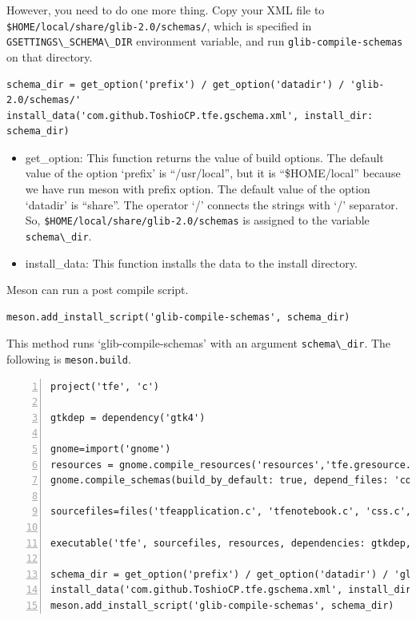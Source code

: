 However, you need to do one more thing. Copy your XML file to
\passthrough{\lstinline!$HOME/local/share/glib-2.0/schemas/!}, which is
specified in \passthrough{\lstinline!GSETTINGS\_SCHEMA\_DIR!}
environment variable, and run
\passthrough{\lstinline!glib-compile-schemas!} on that directory.

\begin{lstlisting}
schema_dir = get_option('prefix') / get_option('datadir') / 'glib-2.0/schemas/'
install_data('com.github.ToshioCP.tfe.gschema.xml', install_dir: schema_dir)
\end{lstlisting}

\begin{itemize}
\tightlist
\item
  get\_option: This function returns the value of build options. The
  default value of the option `prefix' is ``/usr/local'', but it is
  ``\$HOME/local'' because we have run meson with prefix option. The
  default value of the option `datadir' is ``share''. The operator `/'
  connects the strings with `/' separator. So,
  \passthrough{\lstinline!$HOME/local/share/glib-2.0/schemas!} is
  assigned to the variable \passthrough{\lstinline!schema\_dir!}.
\item
  install\_data: This function installs the data to the install
  directory.
\end{itemize}

Meson can run a post compile script.

\begin{lstlisting}
meson.add_install_script('glib-compile-schemas', schema_dir)
\end{lstlisting}

This method runs `glib-compile-schemas' with an argument
\passthrough{\lstinline!schema\_dir!}. The following is
\passthrough{\lstinline!meson.build!}.

\begin{lstlisting}[numbers=left]
project('tfe', 'c')

gtkdep = dependency('gtk4')

gnome=import('gnome')
resources = gnome.compile_resources('resources','tfe.gresource.xml')
gnome.compile_schemas(build_by_default: true, depend_files: 'com.github.ToshioCP.tfe.gschema.xml')

sourcefiles=files('tfeapplication.c', 'tfenotebook.c', 'css.c', '../tfetextview/tfetextview.c')

executable('tfe', sourcefiles, resources, dependencies: gtkdep, export_dynamic: true, install: true)

schema_dir = get_option('prefix') / get_option('datadir') / 'glib-2.0/schemas/'
install_data('com.github.ToshioCP.tfe.gschema.xml', install_dir: schema_dir)
meson.add_install_script('glib-compile-schemas', schema_dir)
\end{lstlisting}


